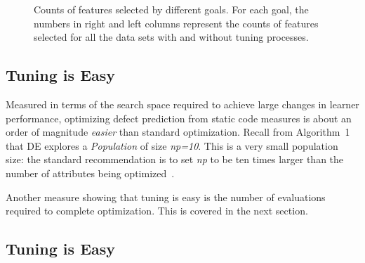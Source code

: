 \documentclass{sig-alternative}
\begin{document}
\begin{center}
\begin{figure}[!h]
\begin{tabular}{c|c c|c c|c c|c c| c c }
  \end{tabular}
    \caption{Counts of features selected by different goals. For each goal, the numbers in right and left columns represent the counts of features selected for all the data sets with and without tuning processes.
    }\label{fig:counts}
\end{figure}




\subsection{Tuning is Easy}\label{sect:easy}

Measured in terms of the search space
required to achieve large changes in learner performance, optimizing defect prediction from static code
measures is about an order of magnitude {\em easier} than standard optimization.
Recall from Algorithm~1 that
DE explores a {\em Population} of size {\em np=10}. This is a very small population size:
the standard recommendation is to set {\em np} to be ten times larger than the number
of attributes being optimized~\cite{stron97}. 

Another measure showing that tuning is easy is the number of evaluations required to complete optimization.
This is covered in the next section.


\subsection{Tuning is Easy}\label{sect:easy}
 



\begin{figure}

{\scriptsize

}
\end{figure}
\end{center}
\end{document}

